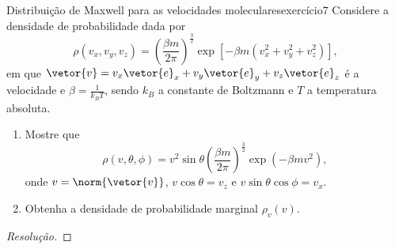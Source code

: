 \begin{exercício}{Distribuição de Maxwell para as velocidades moleculares}{exercício7}
    Considere a densidade de probabilidade dada por
    \begin{equation*}
        \rho(v_x,v_y,v_z) = \left(\frac{\beta m}{2\pi}\right)^{\frac32}\exp\left[-\beta m \left(v_x^2 + v_y^2 + v_z^2\right)\right],
    \end{equation*}
    em que \(\vetor{v} = v_x\vetor{e}_x+v_y\vetor{e}_y+v_z\vetor{e}_z\) é a velocidade e \(\beta = \frac{1}{k_BT}\), sendo \(k_B\) a constante de Boltzmann e \(T\) a temperatura absoluta.
    \begin{enumerate}[label=(\alph*)]
        \item Mostre que
            \begin{equation*}
                \rho(v, \theta, \phi) = v^2 \sin\theta\left(\frac{\beta m}{2\pi}\right)^{\frac32}\exp\left(-\beta m v^2\right),
            \end{equation*}
            onde \(v = \norm{\vetor{v}}\), \(v\cos\theta = v_z\) e \(v\sin\theta\cos\phi = v_x\).
        \item Obtenha a densidade de probabilidade marginal \(\rho_v(v)\).
    \end{enumerate}
\end{exercício}
\begin{proof}[Resolução]
\end{proof}
